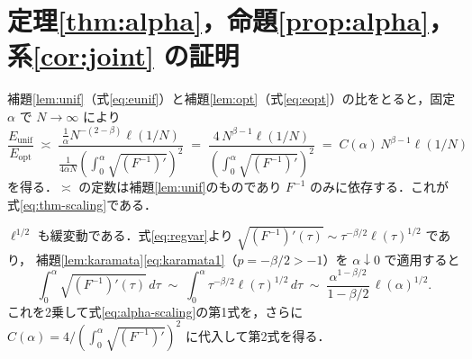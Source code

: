 \documentclass[a4paper,10pt]{jsarticle}
\makeatletter
\theoremstyle{definition}
\renewenvironment{proof}[1][\proofname]{\par
  \pushQED{\qed}%
  \normalfont \topsep6\p@\@plus6\p@\relax
  \trivlist
  \item[\hskip\labelsep\textbf{#1}]\ignorespaces
}{%
  \popQED\endtrivlist\@endpefalse
}
\renewcommand{\proofname}{証明}
\newcommand{\Finv}{F^{-1}}
\newcommand{\Eunif}{E_{\mathrm{unif}}}
\newcommand{\Eopt}{E_{\mathrm{opt}}}
\makeatother
\begin{document}
\section{定理\ref{thm:alpha}，命題\ref{prop:alpha}，系\ref{cor:joint} の証明}
\label{sec:proofs}

\begin{proof}[定理\ref{thm:alpha} の証明]
補題\ref{lem:unif}（式\eqref{eq:eunif}）と補題\ref{lem:opt}（式\eqref{eq:eopt}）の比をとると，固定 $\alpha$ で $N\to\infty$ により
\begin{equation*}
  \frac{\Eunif}{\Eopt}
  \;\asymp\;\frac{\frac1\alpha N^{-(2-\beta)}\ell(1/N)}{\frac1{4\alpha N}\left(\int_0^\alpha\sqrt{(\Finv)'}\right)^{2}}
  \;=\;\frac{4\,N^{\beta-1}\ell(1/N)}{\left(\int_0^\alpha\sqrt{(\Finv)'}\right)^{2}}
  \;=\;C(\alpha)\,N^{\beta-1}\ell(1/N)
\end{equation*}
を得る．$\asymp$ の定数は補題\ref{lem:unif}のものであり $\Finv$ のみに依存する．これが式\eqref{eq:thm-scaling}である．
\end{proof}

\begin{proof}[命題\ref{prop:alpha} の証明]
$\ell^{1/2}$ も緩変動である．式\eqref{eq:regvar}より $\sqrt{(\Finv)'(\tau)}\sim\tau^{-\beta/2}\ell(\tau)^{1/2}$ であり，
補題\ref{lem:karamata}\eqref{eq:karamata1}（$p=-\beta/2>-1$）を $\alpha\downarrow0$ で適用すると
\begin{equation*}
\int_0^\alpha\sqrt{(\Finv)'(\tau)}\,d\tau
\;\sim\;\int_0^\alpha\tau^{-\beta/2}\ell(\tau)^{1/2}\,d\tau
\;\sim\;\frac{\alpha^{1-\beta/2}}{1-\beta/2}\,\ell(\alpha)^{1/2}.
\end{equation*}
これを2乗して式\eqref{eq:alpha-scaling}の第1式を，さらに $C(\alpha)=4/(\int_0^\alpha\sqrt{(\Finv)'})^2$ に代入して第2式を得る．
\end{proof}
\end{document}
